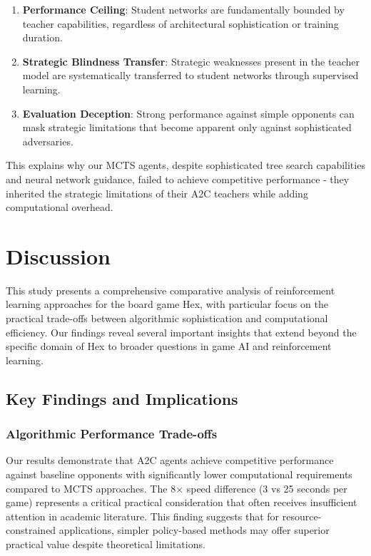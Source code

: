 \documentclass[conference]{IEEEtran}
\begin{document}
\begin{enumerate}
\item \textbf{Performance Ceiling}: Student networks are fundamentally bounded by teacher capabilities, regardless of architectural sophistication or training duration.

\item \textbf{Strategic Blindness Transfer}: Strategic weaknesses present in the teacher model are systematically transferred to student networks through supervised learning.

\item \textbf{Evaluation Deception}: Strong performance against simple opponents can mask strategic limitations that become apparent only against sophisticated adversaries.
\end{enumerate}

This explains why our MCTS agents, despite sophisticated tree search capabilities and neural network guidance, failed to achieve competitive performance - they inherited the strategic limitations of their A2C teachers while adding computational overhead.

\section{Discussion}

This study presents a comprehensive comparative analysis of reinforcement learning approaches for the board game Hex, with particular focus on the practical trade-offs between algorithmic sophistication and computational efficiency. Our findings reveal several important insights that extend beyond the specific domain of Hex to broader questions in game AI and reinforcement learning.

\subsection{Key Findings and Implications}

\subsubsection{Algorithmic Performance Trade-offs}

Our results demonstrate that A2C agents achieve competitive performance against baseline opponents with significantly lower computational requirements compared to MCTS approaches. The 8× speed difference (3 vs 25 seconds per game) represents a critical practical consideration that often receives insufficient attention in academic literature. This finding suggests that for resource-constrained applications, simpler policy-based methods may offer superior practical value despite theoretical limitations.
\end{document}
